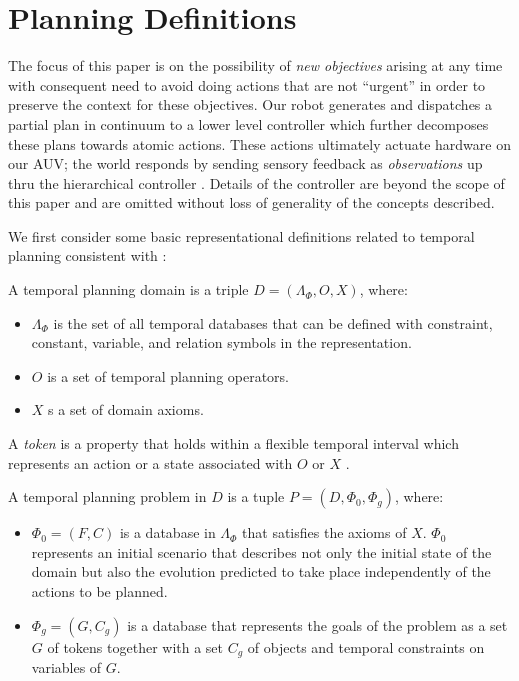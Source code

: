 \section{Planning Definitions}
\label{sec: defs}

The focus of this paper is on the possibility of \emph{new objectives}
arising at any time with consequent need to avoid doing actions that
are not ``urgent'' in order to preserve the context for these
objectives. Our robot generates and dispatches a partial plan in
continuum to a lower level controller which further decomposes these
plans towards atomic actions. These actions ultimately actuate
hardware on our AUV; the world responds by sending sensory feedback as
\emph{observations} up thru the hierarchical controller
\cite{mcgann08bdup,rajan12dup}. Details of the controller are beyond
the scope of this paper and are omitted without loss of generality of
the concepts described.

We first consider some basic representational definitions related to
temporal planning consistent with \cite{Nau:2004}:


\begin{definition}
  \label{def:domain}
  A temporal planning domain is a triple $D = ( \Lambda_\Phi, O, X )$, where:
  \begin{itemize}
  \item $\Lambda_\Phi$ is the set of all temporal databases that can
    be defined with constraint, constant, variable, and relation
    symbols in the representation.
  \item $O$ is a set of temporal planning operators.
  \item $X$ s a set of domain axioms.
  \end{itemize}
\end{definition}

A \emph{token} is a property that holds within a flexible temporal
interval which represents an action or a state associated with $O$ or
$X$ \cite{py10dup}. 

\begin{definition}
  \label{def:problem}
  A temporal planning problem in $D$ is a tuple $P = ( D, \Phi_0, \Phi_g )$, where:
  \begin{itemize}
  \item $\Phi_0 = (F, C)$ is a database in $\Lambda_\Phi$ that
    satisfies the axioms of $X$.  $\Phi_0$ represents an initial
    scenario that describes not only the initial state of the domain
    but also the evolution predicted to take place independently of
    the actions to be planned.
  \item $\Phi_g = (G, C_g)$ is a database that represents the goals of
    the problem as a set $G$ of tokens together with a set $C_g$ of
    objects and temporal constraints on variables of $G$.
  \end{itemize}
\end{definition}

